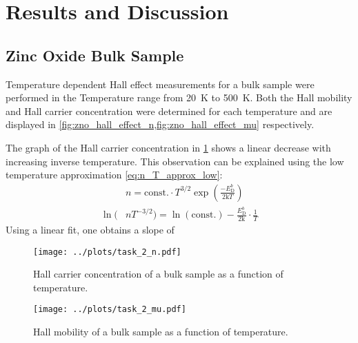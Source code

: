 \section{Results and Discussion}

\subsection{Zinc Oxide Bulk Sample }
Temperature dependent Hall effect measurements for a bulk  sample 
were performed in the Temperature range from \qty{20}{\kelvin} to \qty{500}{\kelvin}.
Both the Hall mobility and Hall carrier concentration were determined for each temperature and are displayed in 
\cref{fig:zno_hall_effect_n,fig:zno_hall_effect_mu} respectively.

The graph of the Hall carrier concentration in \cref{fig:zno_hall_effect_n} shows a linear decrease with increasing inverse temperature. 
This observation can be explained using the low temperature approximation \cref{eq:n_T_approx_low}:
\begin{align}
	&n = \text{const.} \cdot T^{3/2} \exp\left( \frac{-E_{\mathrm{D}}^{b}}{2 \mathrm{k}T} \right) \\
	\ln(&n T^{-3/2}) = \ln(\text{const.}) - \frac{E_{\mathrm{D}}^{b}}{2 \mathrm{k}} \cdot \frac{1}{T}
\end{align}
Using a linear fit, one obtains a slope of 

\begin{figure}
	\centering
	\texttt{[image: ../plots/task\_2\_n.pdf]}
	\caption{Hall carrier concentration of a bulk  sample as a function of temperature.}
	\label{fig:zno_hall_effect_n}
\end{figure}
\begin{figure}
	\centering
	\texttt{[image: ../plots/task\_2\_mu.pdf]}
	\caption{Hall mobility of a bulk  sample as a function of temperature.}
	\label{fig:zno_hall_effect_mu}
\end{figure}